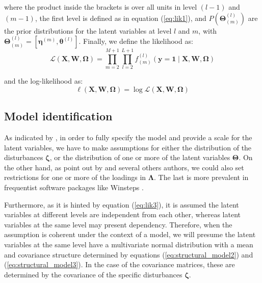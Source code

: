 \noindent where the product inside the brackets is over all units in level $(l-1)$ and $(m-1)$, the first level is defined as in equation (\ref{eq:lik1}), and $P( \pmb{\Theta}^{(l)}_{(m)} )$ are the prior distributions for the latent variables at level $l$ and $m$, with $\pmb{\Theta}^{(l)}_{(m)} = [\pmb{\eta}^{(m)}, \pmb{\theta}^{(l)}]$. Finally, we define the likelihood as:
%
\begin{equation} \label{eq:lik3}
	\mathcal{L}(\mathbf{X}, \mathbf{W}, \pmb{\Omega}) = \prod_{m=2}^{M+1} \prod_{l=2}^{L+1} f^{(l)}_{(m)} \left( \mathbf{y}=\mathbf{1} \; | \; \mathbf{X}, \mathbf{W}, \pmb{\Omega} \right)
\end{equation}

\noindent and the log-likelihood as:
%
\begin{equation} \label{eq:loglik}
	\ell(\mathbf{X}, \mathbf{W}, \pmb{\Omega}) = \log \mathcal{L}(\mathbf{X}, \mathbf{W}, \pmb{\Omega})
\end{equation}


\subsection{Model identification} \label{sect:identification}

As indicated by \citet{Rabe_et_al_2004a}, in order to fully specify the model and provide a scale for the latent variables, we have to make assumptions for either the distribution of the disturbances $\pmb{\zeta}$, or the distribution of one or more of the latent variables $\pmb{\Theta}$. On the other hand, as point out by \citet{Fujimoto_2018b} and several others authors, we could also set restrictions for one or more of the loadings in $\pmb{\Lambda}$. The last is more prevalent in frequentist software packages like Winsteps \cite{Winsteps2021}.

Furthermore, as it is hinted by equation (\ref{eq:lik3}), it is assumed the latent variables at different levels are independent from each other, whereas latent variables at the same level may present dependency. Therefore, when the assumption is coherent under the context of a model, we will presume the latent variables at the same level have a multivariate normal distribution with a mean and covariance structure determined by equations (\ref{eq:structural_model2}) and (\ref{eq:structural_model3}). In the case of the covariance matrices, these are determined by the covariance of the specific disturbances $\pmb{\zeta}$. 

